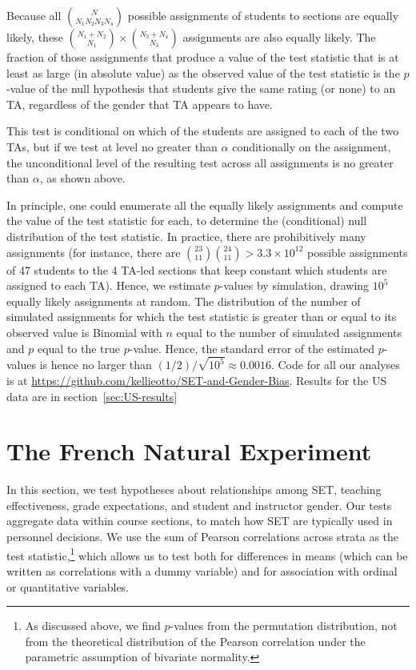 \documentclass[12pt]{article}
\begin{document}
Because all ${N}\choose{N_1 N_2 N_3 N_4}$ possible assignments of students
to sections are equally likely, these 
${{N_1 + N_2} \choose {N_1}} \times {{N_3+N_4} \choose {N_3}}$ 
assignments are also equally likely.
The fraction of those assignments that produce a value of the test statistic that
is at least as large (in absolute value) as the observed value of the test statistic
is the $p$-value of the null hypothesis that students give the same rating (or none) to
an TA, regardless of the gender that TA appears to have.

This test is conditional on which of the students are assigned to each of the two 
TAs, but if we test at level no greater than $\alpha$ conditionally on the
assignment, the unconditional level of the resulting test across all assignments is no 
greater than $\alpha$, as shown above.

In principle, one could enumerate all the equally likely assignments and compute the value
of the test statistic for each, to determine the (conditional) null distribution of the test
statistic.
In practice, there are prohibitively many assignments
(for instance, there are ${{23}\choose{11}}{{24}\choose{11}} > 3.3\times 10^{12}$ 
possible assignments
of 47 students to the 4 TA-led sections that keep constant which
students are assigned to each TA).
Hence, we estimate $p$-values by simulation, drawing $10^5$ equally likely assignments
at random.
The distribution of the number of simulated assignments for which the test statistic
is greater than or equal to its observed value is Binomial with $n$ equal to the number of
simulated assignments and $p$ equal to the true $p$-value.
Hence, the standard error of the estimated $p$-values is hence no larger than 
$(1/2)/ \sqrt{10^5}
\approx 0.0016$.
Code for all our analyses is at \url{https://github.com/kellieotto/SET-and-Gender-Bias}.
Results for the US data are in section~\ref{sec:US-results}

\section{The French Natural Experiment} \label{sec:Fr-results}
In this section, we test hypotheses about relationships among
SET, teaching effectiveness, grade expectations, and student and instructor gender.
Our tests aggregate data within course sections, to match how SET are typically
used in personnel decisions. 
We use the sum of Pearson correlations across strata as the test statistic,\footnote{%
   As discussed above, we find $p$-values from the permutation distribution, not from
   the theoretical distribution of the Pearson correlation 
   under the parametric assumption of bivariate normality.
} 
which allows us to test both for 
differences in means (which can be written as correlations with a dummy variable) and for 
association with ordinal or quantitative variables.
\end{document}
